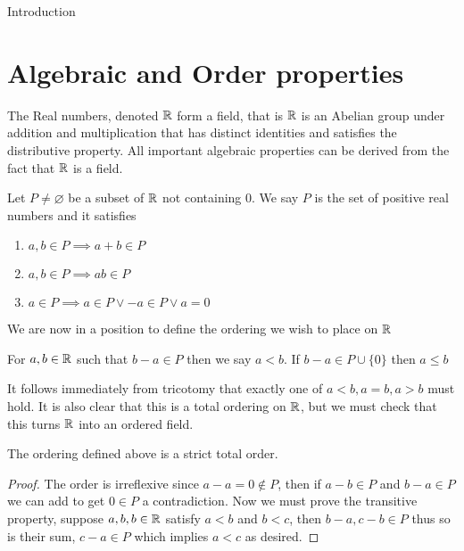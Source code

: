 \begin{chapter}{Introduction}
    \section{Algebraic and Order properties}
    The Real numbers, denoted $\mathbb{R}$ form a field, that is $\mathbb{R}$ is an Abelian group under addition and multiplication that 
    has distinct identities and satisfies the distributive property. All important algebraic properties can be derived from the fact 
    that $\mathbb{R}$ is a field. 

    
    \begin{defn}
        Let $P \neq \varnothing$ be a subset of $\mathbb{R}$ not containing $0$. We say $P$ is the set of positive real numbers and it satisfies 
        
        \begin{enumerate}
           \item  $a, b \in  P \implies a + b \in P$
           \item $a,b \in P \implies ab \in P$ 
           \item $a \in P \implies a \in P \vee -a \in P \vee  a = 0$
            
        \end{enumerate}
    \end{defn}

    We are now in a position to define the ordering we wish to place on $\mathbb{R}$ 

    
    \begin{defn}
        For $a, b \in \mathbb{R}$ such that $b - a \in P$ then we say $a < b$. 
        If $b -a \in P \cup \{0\}$ then $a \leq b$
    \end{defn}

    It follows immediately from tricotomy that exactly one of $a < b, a = b, a > b$ must hold. 
    It is also clear that this is a total ordering on $\mathbb{R}$, but we must check that this turns $\mathbb{R}$ into an ordered field. 

    
    \begin{lem}
        The ordering defined above is a strict total order. 
    \end{lem}

    
    \begin{proof}
        The order is irreflexive since $a-a = 0 \notin P$, then if $a - b \in P$ and $b - a \in P$ we can add to get 
        $0 \in P$ a contradiction. Now we must prove the transitive property, suppose $a, b, b \in \mathbb{R}$ satisfy 
        $a < b $ and $b < c$, then $b - a, c - b \in P$ thus so is their sum, $c - a \in P$ which implies $a < c$ as desired. 
    \end{proof}


\end{chapter}
